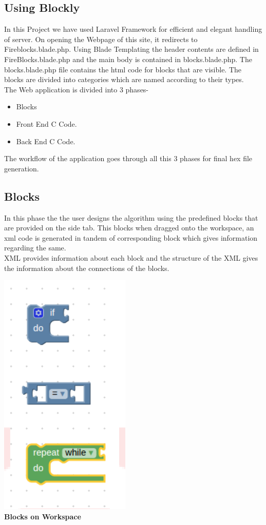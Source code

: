 \documentclass[a4paper,12pt,oneside]{book}
\begin{document}
\subsection{Using Blockly}
    In this Project we have used Laravel Framework for efficient and elegant handling of server.
    On opening the Webpage of this site, it redirects to Fireblocks.blade.php. Using Blade Templating the header contents are defined in FireBlocks.blade.php
    and the main body is contained in blocks.blade.php. The blocks.blade.php file contains the html code for blocks that are visible.
    The blocks are divided into categories which are named according to their types. \\
    The Web application is divided into 3 phases-
    \begin{itemize}
     \item Blocks
     \item Front End C Code.
     \item Back End C Code.
    \end{itemize}
    The workflow of the application goes through all this 3 phases for final hex file generation.\\
   \subsection{Blocks}
    In this phase the the user designs the algorithm using the predefined blocks that are provided on the side tab.
    This blocks when dragged onto the workspace, an xml code is generated in tandem of corresponding block which gives information regarding the same.\\
    XML provides information about each block and the structure of the XML  gives the information about the connections of the blocks.
    \begin{center}
    \includegraphics[scale =0.6]{imag5}\\[.3in]
    \textbf{Blocks on Workspace}\\[1.3in]
    \end{center}
\end{document}
